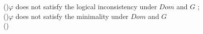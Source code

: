 

\begin{algorithm}[h]
    \caption{}\label{alg:update}

    \If(){$\varphi$ does not satisfy the logical inconsistency under $Dom$ and $G$}{
        \Return{$\phi,\phi^*$};\\
    }
    \ElseIf(){$\varphi$ does not satisfy the minimality under $Dom$ and $G$}{
        \Return{$\varphi,\phi^*$}\\
    }
    \Else(){
        \Return{$\varphi,\varphi$}\\
    }

\end{algorithm}


